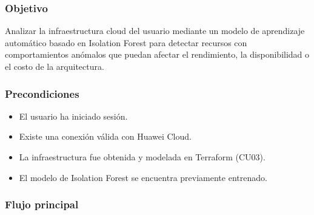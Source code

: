 \subsubsection*{Objetivo}

Analizar la infraestructura cloud del usuario mediante un modelo de aprendizaje automático basado en Isolation Forest para detectar recursos con comportamientos anómalos que puedan afectar el rendimiento, la disponibilidad o el costo de la arquitectura.

\subsubsection*{Precondiciones}

\begin{itemize}
\item El usuario ha iniciado sesión.
\item Existe una conexión válida con Huawei Cloud.
\item La infraestructura fue obtenida y modelada en Terraform (CU03).
\item El modelo de Isolation Forest se encuentra previamente entrenado.
\end{itemize}

\subsubsection*{Flujo principal}

